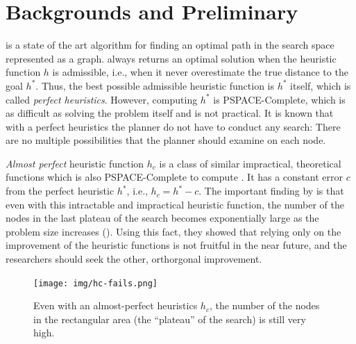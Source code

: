 \section{Backgrounds and Preliminary}
\label{sec-1}



\astar is a state of the art algorithm for finding an optimal path in the
search space represented as a graph. 
\astar always returns an optimal solution when the heuristic function $h$ is
admissible, i.e., when it never overestimate the true distance to the goal
$h^*$.
% 
Thus, the best possible admissible heuristic function is $h^*$ itself, which is
called \emph{perfect heuristics}. However, computing $h^*$ is PSPACE-Complete,
which is as difficult as solving the problem itself and is not
practical. It is known that with a perfect heuristics the planner do not have to conduct any search: There are no multiple possibilities that the planner should examine on each node.

\emph{Almost perfect} heuristic function $h_c$ is a class of similar
impractical, theoretical functions which is also PSPACE-Complete to compute \cite{helmert2008good}.
It has a constant error $c$ from the perfect heuristic $h^*$, i.e., $h_c=h^*-c$.
The important finding by \citeauthor{helmert2008good} is that even with this intractable and impractical heuristic function, the number of the nodes in the last plateau of the search becomes exponentially large as the problem size increases ().
Using this fact, they showed that relying only on the improvement of the heuristic functions is not fruitful in the near future, and the researchers should seek the other, orthorgonal improvement.

\begin{figure}[htbp]
 \centering
 \texttt{[image: img/hc-fails.png]}
 \caption{Even with an almost-perfect heuristics $h_c$, the number of the nodes in the rectangular area (the ``plateau'' of the search) is still very high.}
 \label{hc-fails}
\end{figure}

